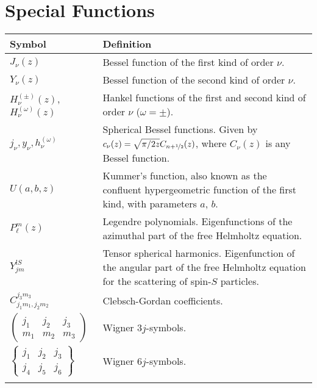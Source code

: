 \section*{Special Functions}
\begin{tabularx}{\textwidth}{lX}
  \hline\hline
  Symbol			& Definition	\\
  \hline\hline
  $J_\nu(z)$		& Bessel function of the first kind of order $\nu$.	\\
  $Y_\nu(z)$		& Bessel function of the second kind of order $\nu$.	\\
  $H_\nu^{(\pm)}(z)$, %
  $H_\nu^{(\omega)}(z)$& Hankel functions of the first and second kind of order $\nu$ ($\omega=\pm$).\\
  $j_\nu,y_\nu,h^{(\omega)}_\nu$	
  					& Spherical Bessel functions. Given by $c_\nu(z)=\sqrt{\pi/2z}C_{n+\nicefrac{1}{2}}(z)$, where $C_\nu(z)$ is any Bessel function. \\
  $U(a,b,z)$		& Kummer's function, also known as the confluent hypergeometric function of the first kind, with parameters $a$, $b$. \\
  $P_\ell^m(z)$		& Legendre polynomials. Eigenfunctions of the azimuthal part of the free Helmholtz equation.\\
  $Y_{jm}^{lS}$		& Tensor spherical harmonics. Eigenfunction of the angular part of the free Helmholtz equation for the scattering of spin-$S$ 
  						particles.\\
  $C_{j_1m_1,j_2m_2}^{j_3m_3}$ 
  					& Clebsch-Gordan coefficients.	\\
  $\begin{pmatrix} j_1 & j_2 & j_3 \\ m_1 & m_2 & m_3 \end{pmatrix}$
  					& Wigner $3j$-symbols.	\\
  $\begin{Bmatrix} j_1 & j_2 & j_3 \\ j_4 & j_5 & j_6\end{Bmatrix}$ 
  					& Wigner $6j$-symbols.	\\ 
  \hline\hline				\\
\end{tabularx}

